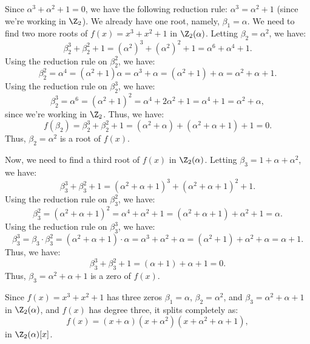 \begin{solution}
  Since $\alpha^3 + \alpha^2 + 1 = 0$, we have the following reduction rule: $\alpha^3 = \alpha^2 + 1$ (since we're working in $\Z_2$). We already have one root, namely, $\beta_1 = \alpha$. We need to find two more roots of $f(x) = x^3 + x^2 + 1$ in $\Z_2(\alpha)$. Letting $\beta_2 = \alpha^2$, we have:
  \[%
    \beta_2^3 + \beta_2^2 + 1 = (\alpha^2)^3 + (\alpha^2)^2 + 1 = \alpha^6 + \alpha^4 + 1
  .\]%
  Using the reduction rule on $\beta_2^2$, we have:
  \[%
    \beta_2^2 = \alpha^4 = (\alpha^2 + 1)\alpha = \alpha^3 + \alpha = (\alpha^2 + 1) + \alpha = \alpha^2 + \alpha + 1
  .\]%
  Using the reduction rule on $\beta_2^3$, we have:
  \[%
    \beta_2^3 = \alpha^6 = (\alpha^2 + 1)^2 = \alpha^4 + 2\alpha^2 + 1 = \alpha^4 + 1 = \alpha^2 + \alpha
  ,\]%
  since we're working in $\Z_2$. Thus, we have:
  \[%
    f(\beta_2) = \beta_2^3 + \beta_2^2 + 1 = (\alpha^2 + \alpha) + (\alpha^2 + \alpha + 1) + 1 = 0
  .\]%
  Thus, $\beta_2 = \alpha^2$ is a root of $f(x)$.

  Now, we need to find a third root of $f(x)$ in $\Z_2(\alpha)$. Letting $\beta_3 = 1 + \alpha + \alpha^2$, we have:
  \[%
    \beta_3^3 + \beta_3^2 + 1 = (\alpha^2 + \alpha + 1)^3 + (\alpha^2 + \alpha + 1)^2 + 1
  .\]%
  Using the reduction rule on $\beta_3^2$, we have:
  \[%
    \beta_3^2 = (\alpha^2 + \alpha + 1)^2 = \alpha^4 + \alpha^2 + 1 = (\alpha^2 + \alpha + 1) + \alpha^2 + 1 = \alpha
  .\]%
  Using the reduction rule on $\beta_3^3$, we have:
  \[%
    \beta_3^3 = \beta_3 \cdot \beta_3^2 = (\alpha^2 + \alpha + 1) \cdot \alpha = \alpha^3 + \alpha^2 + \alpha = (\alpha^2 + 1) + \alpha^2 + \alpha = \alpha + 1
  .\]%
  Thus, we have:
  \[%
    \beta_3^3 + \beta_3^2 + 1 = (\alpha + 1) + \alpha + 1 = 0
  .\]%
  Thus, $\beta_3 = \alpha^2 + \alpha + 1$ is a zero of $f(x)$.

  Since $f(x) = x^3 + x^2 + 1$ has three zeros $\beta_1 = \alpha$, $\beta_2 = \alpha^2$, and $\beta_3 = \alpha^2 + \alpha + 1$ in $\Z_2(\alpha)$, and $f(x)$ has degree three, it splits completely as:
  \[%
    f(x) = (x + \alpha)(x + \alpha^2)(x + \alpha^2 + \alpha + 1)
  ,\]%
  in $\Z_2(\alpha)[x]$.
\end{solution}
